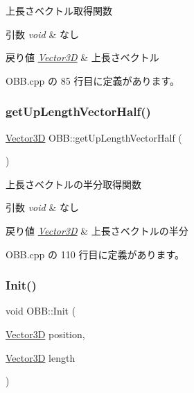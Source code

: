 上長さベクトル取得関数 


\begin{DoxyParams}{引数}
{\em void} & なし \\
\hline
\end{DoxyParams}

\begin{DoxyRetVals}{戻り値}
{\em \mbox{\hyperlink{class_vector3_d}{Vector3D}}} & 上長さベクトル \\
\hline
\end{DoxyRetVals}


 O\+B\+B.\+cpp の 85 行目に定義があります。

\mbox{\label{class_o_b_b_a570ab6551e9995c67db27fe85b081611}} 
\subsubsection{\texorpdfstring{get\+Up\+Length\+Vector\+Half()}{getUpLengthVectorHalf()}}
{\footnotesize\ttfamily \mbox{\hyperlink{class_vector3_d}{Vector3D}} O\+B\+B\+::get\+Up\+Length\+Vector\+Half (\begin{DoxyParamCaption}{ }\end{DoxyParamCaption})}



上長さベクトルの半分取得関数 


\begin{DoxyParams}{引数}
{\em void} & なし \\
\hline
\end{DoxyParams}

\begin{DoxyRetVals}{戻り値}
{\em \mbox{\hyperlink{class_vector3_d}{Vector3D}}} & 上長さベクトルの半分 \\
\hline
\end{DoxyRetVals}


 O\+B\+B.\+cpp の 110 行目に定義があります。

\mbox{\label{class_o_b_b_ae5d7ba6a226b2da4271ffd16d478d800}} 
\subsubsection{\texorpdfstring{Init()}{Init()}}
{\footnotesize\ttfamily void O\+B\+B\+::\+Init (\begin{DoxyParamCaption}\item[{\mbox{\hyperlink{class_vector3_d}{Vector3D}}}]{position,  }\item[{\mbox{\hyperlink{class_vector3_d}{Vector3D}}}]{length }\end{DoxyParamCaption})}




